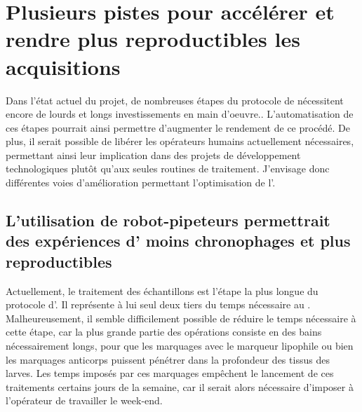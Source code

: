 \documentclass[\main/main.tex]{subfiles}
\begin{document}
                    
\section{
    \label{sec:automatisation}
   Plusieurs pistes pour accélérer et rendre plus reproductibles les acquisitions
    }
 
%   
Dans l'état actuel du projet, de nombreuses étapes du protocole de \hti{} nécessitent encore de lourds et longs investissements en main d'oeuvre..
%
L'automatisation de ces étapes pourrait ainsi permettre d'augmenter le rendement de ce procédé.
%
De plus, il serait possible de libérer les opérateurs humains actuellement nécessaires,
permettant ainsi leur implication dans des projets de développement technologiques plutôt qu'aux seules routines de traitement.
%
J'envisage donc différentes voies d'amélioration permettant l'optimisation de l'\hti{}.

    \subsection{L'utilisation de robot-pipeteurs permettrait des expériences d'\ihcie{} moins chronophages et plus reproductibles}
    
%
Actuellement, le traitement \ihc{} des échantillons est l'étape la plus longue du protocole d'\hti{}.
%
Il représente à lui seul deux tiers du temps nécessaire au \hcs{}.
%
Malheureusement, il semble difficilement possible de réduire le temps nécessaire à cette étape,
car la plus grande partie des opérations consiste en des bains nécessairement longs,
pour que les marquages avec le marqueur lipophile ou bien les marquages anticorps puissent pénétrer dans la profondeur des tissus des larves.
%
Les temps imposés par ces marquages empêchent le lancement de ces traitements certains jours de la semaine,
car il serait alors nécessaire d'imposer à l'opérateur de travailler le week-end.
\end{document}
